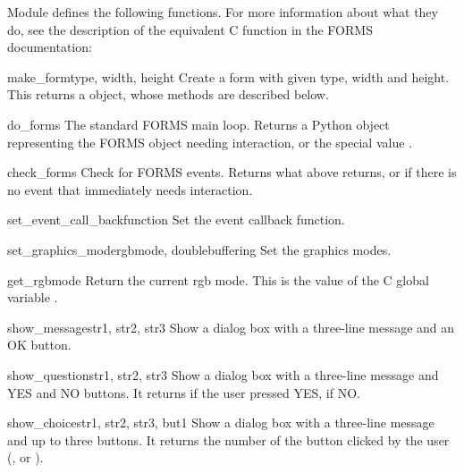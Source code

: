 Module  defines the following functions.  For more
information about what they do, see the description of the equivalent
C function in the FORMS documentation:

\begin{funcdesc}{make_form}{type, width, height}
Create a form with given type, width and height.  This returns a
 object, whose methods are described below.
\end{funcdesc}

\begin{funcdesc}{do_forms}{}
The standard FORMS main loop.  Returns a Python object representing
the FORMS object needing interaction, or the special value
.
\end{funcdesc}

\begin{funcdesc}{check_forms}{}
Check for FORMS events.  Returns what  above
returns, or  if there is no event that immediately needs
interaction.
\end{funcdesc}

\begin{funcdesc}{set_event_call_back}{function}
Set the event callback function.
\end{funcdesc}

\begin{funcdesc}{set_graphics_mode}{rgbmode, doublebuffering}
Set the graphics modes.
\end{funcdesc}

\begin{funcdesc}{get_rgbmode}{}
Return the current rgb mode.  This is the value of the C global
variable .
\end{funcdesc}

\begin{funcdesc}{show_message}{str1, str2, str3}
Show a dialog box with a three-line message and an OK button.
\end{funcdesc}

\begin{funcdesc}{show_question}{str1, str2, str3}
Show a dialog box with a three-line message and YES and NO buttons.
It returns  if the user pressed YES,  if NO.
\end{funcdesc}

\begin{funcdesc}{show_choice}{str1, str2, str3, but1}
Show a dialog box with a three-line message and up to three buttons.
It returns the number of the button clicked by the user
(,  or ).
\end{funcdesc}

